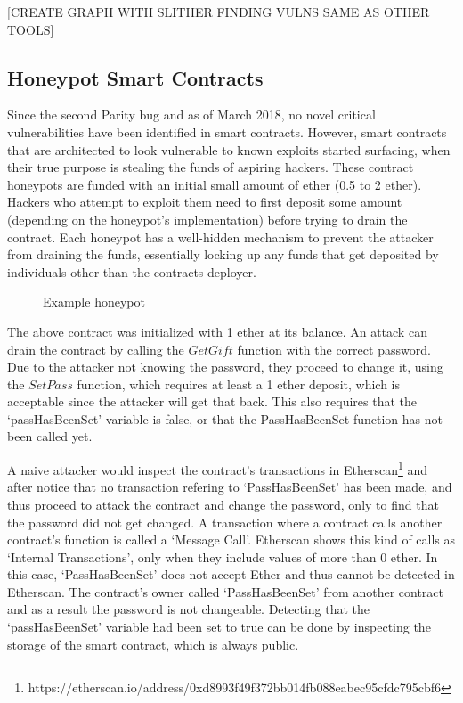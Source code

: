 [CREATE GRAPH WITH SLITHER FINDING VULNS SAME AS OTHER TOOLS]

\subsection{Honeypot Smart Contracts}
Since the second Parity bug and as of March 2018, no novel critical vulnerabilities have been identified in smart contracts. However, smart contracts that are architected to look vulnerable to known exploits started surfacing, when their true purpose is stealing the funds of aspiring hackers. These contract honeypots are funded with an initial small amount of ether (0.5 to 2 ether). Hackers who attempt to exploit them need to first deposit some amount (depending on the honeypot's implementation) before trying to drain the contract. Each honeypot has a well-hidden mechanism to prevent the attacker from draining the funds, essentially locking up any funds that get deposited by individuals other than the contracts deployer. 

\begin{figure}[H]
    \centering
    
    \caption{Example honeypot}
    \label{smart_contract}
\end{figure}

The above contract was initialized with 1 ether at its balance. An attack can drain the contract by calling the $GetGift$ function with the correct password. Due to the attacker not knowing the password, they proceed to change it, using the $SetPass$ function, which requires at least a 1 ether deposit, which is acceptable since the attacker will get that back. This also requires that the `passHasBeenSet' variable is false, or that the PassHasBeenSet function has not been called yet.

A naive attacker would inspect the contract's transactions in Etherscan\footnote{https://etherscan.io/address/0xd8993f49f372bb014fb088eabec95cfdc795cbf6} and after notice that no transaction refering to `PassHasBeenSet' has been made, and thus proceed to attack the contract and change the password, only to find that the password did not get changed. A transaction where a contract calls another contract's function is called a `Message Call'. Etherscan shows this kind of calls as `Internal Transactions', only when they include values of more than 0 ether. In this case, `PassHasBeenSet' does not accept Ether and thus cannot be detected in Etherscan. The contract's owner called `PassHasBeenSet' from another contract and as a result the password is not changeable. Detecting that the `passHasBeenSet' variable had been set to true can be done by inspecting the storage of the smart contract, which is always public.


